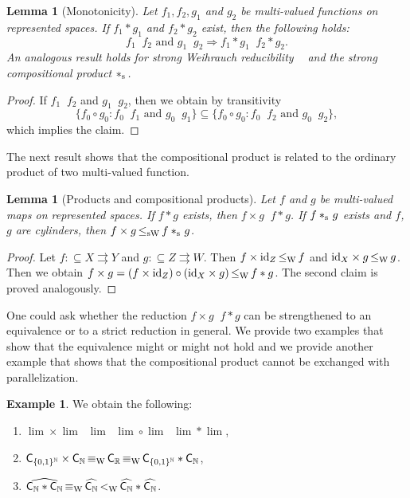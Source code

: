 \documentclass[a4paper]{amsart}
\def\IN{{\mathbb{N}}}
\def\IR{{\mathbb{R}}}
\def\TO{\Longrightarrow}
\def\In{\subseteq}
\def\mto{\rightrightarrows}
\def\id{{\rm id}}
\def\Cantor{{\{0,1\}^\IN}}
\def\C{\mbox{\rm\sffamily C}}
\def\leqW{\mathop{\leq_{\mathrm{W}}}}
\def\equivW{\mathop{\equiv_{\mathrm{W}}}}
\def\leqSW{\mathop{\leq_{\mathrm{sW}}}}
\def\lW{\mathop{<_{\mathrm{W}}}}
\def\stars{*_{\rm s}\;\!}
\newtheorem{lemma}[theorem]{Lemma}
\theoremstyle{definition}
\newtheorem{example}[theorem]{Example}
\begin{document}
\begin{lemma}[Monotonicity]
\label{lem:monotone-composition}
Let $f_1,f_2,g_1$ and $g_2$ be multi-valued functions on represented
spaces. If $f_1*g_1$ and $f_2*g_2$ exist, then the following holds:
\[f_1\leqW f_2\mbox{ and }g_1\leqW g_2\TO f_1*g_1\leqW f_2*g_2.\]
An analogous result holds for strong Weihrauch reducibility $\leqSW$ and
the strong compositional product $\stars$.
\end{lemma}
\begin{proof}
If $f_1\leqW f_2$ and $g_1\leqW g_2$, then we obtain by transitivity 
\[\{f_0\circ g_0:f_0\leqW f_1\mbox{ and }g_0\leqW g_1\}\In\{f_0\circ g_0:f_0\leqW f_2\mbox{ and }g_0\leqW g_2\},\]
which implies the claim.
\end{proof}

The next result shows that the compositional product is related to 
the ordinary product of two multi-valued function.

\begin{lemma}[Products and compositional products]
Let $f$ and $g$ be multi-valued maps on represented spaces. 
If $f*g$ exists, then $f\times g\leqW f*g$.
If $f\stars g$ exists and $f$, $g$ are cylinders, then $f\times g\leqSW f\stars g$.
\end{lemma}
\begin{proof}
Let $f:\In X\mto Y$ and $g:\In Z\mto W$. Then $f\times\id_Z\leqW f$ and $\id_X\times g\leqW g$.
Then we obtain 
$f\times g=(f\times\id_Z)\circ(\id_X\times g)\leqW f*g$.
The second claim is proved analogously.
\end{proof}

One could ask whether the reduction $f\times g\leqW f*g$ can be strengthened to
an equivalence or to a strict reduction in general.
We provide two examples that show that the equivalence might or might not hold
and we provide another example that shows that the compositional product cannot 
be exchanged with parallelization.

\begin{example} 
\label{ex:products}
We obtain the following:
\begin{enumerate}
\item $\lim\times\lim\equivW\lim\lW\lim\circ\lim\equivW\lim*\lim$,
\item $\C_{\Cantor}\times\C_\IN\equivW\C_\IR\equivW\C_{\Cantor}*\C_\IN$,
\item $\widehat{\C_\IN*\C_\IN}\equivW\widehat{\C_\IN}\lW\widehat{\C_\IN}*\widehat{\C_\IN}$.
\end{enumerate}
\end{example}
\end{document}
